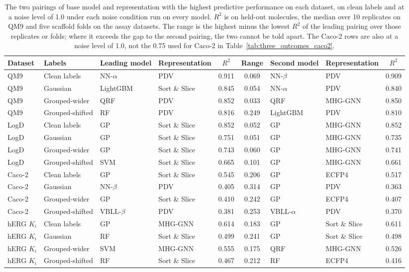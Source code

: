 \begin{table}[!htbp]
\centering
\small
\begin{adjustbox}{max width=\textwidth,max totalheight=0.78\textheight}
\begin{tabular}{llllccllc}
\toprule
Dataset & Labels & Leading model & Representation & $R^2$ & Range & Second model & Representation & $R^2$ \\
\midrule
QM9 & Clean labels & NN-$\alpha$ & PDV & 0.911 & 0.069 & NN-$\beta$ & PDV & 0.909 \\
QM9 & Gaussian & LightGBM & Sort \& Slice & 0.845 & 0.054 & NN-$\alpha$ & PDV & 0.840 \\
QM9 & Grouped-wider & QRF & PDV & 0.852 & 0.033 & QRF & MHG-GNN & 0.850 \\
QM9 & Grouped-shifted & RF & PDV & 0.816 & 0.249 & LightGBM & PDV & 0.810 \\
LogD & Clean labels & GP & Sort \& Slice & 0.852 & 0.052 & GP & MHG-GNN & 0.852 \\
LogD & Gaussian & GP & Sort \& Slice & 0.751 & 0.051 & GP & MHG-GNN & 0.735 \\
LogD & Grouped-wider & GP & Sort \& Slice & 0.743 & 0.060 & GP & MHG-GNN & 0.741 \\
LogD & Grouped-shifted & SVM & Sort \& Slice & 0.665 & 0.101 & GP & MHG-GNN & 0.661 \\
Caco-2 & Clean labels & GP & Sort \& Slice & 0.545 & 0.206 & GP & ECFP4 & 0.517 \\
Caco-2 & Gaussian & NN-$\beta$ & PDV & 0.405 & 0.314 & GP & PDV & 0.363 \\
Caco-2 & Grouped-wider & GP & Sort \& Slice & 0.410 & 0.242 & GP & ECFP4 & 0.407 \\
Caco-2 & Grouped-shifted & VBLL-$\beta$ & PDV & 0.381 & 0.253 & VBLL-$\alpha$ & PDV & 0.370 \\
hERG $K_i$ & Clean labels & GP & MHG-GNN & 0.614 & 0.183 & GP & Sort \& Slice & 0.611 \\
hERG $K_i$ & Gaussian & RF & Sort \& Slice & 0.499 & 0.241 & GP & Sort \& Slice & 0.498 \\
hERG $K_i$ & Grouped-wider & SVM & MHG-GNN & 0.555 & 0.175 & QRF & MHG-GNN & 0.526 \\
hERG $K_i$ & Grouped-shifted & RF & Sort \& Slice & 0.467 & 0.212 & RF & ECFP4 & 0.416 \\
\bottomrule
\end{tabular}
\end{adjustbox}
\caption[Leading pairings of model and representation on each dataset.]{The two pairings of base model and representation with the highest predictive performance on each dataset, on clean labels and at a noise level of 1.0 under each noise condition run on every model. $R^2$ is on held-out molecules, the median over 10 replicates on QM9 and five scaffold folds on the assay datasets. The range is the highest minus the lowest $R^2$ of the leading pairing over those replicates or folds; where it exceeds the gap to the second pairing, the two cannot be told apart. The Caco-2 rows are also at a noise level of 1.0, not the 0.75 used for Caco-2 in Table~\ref{tab:three_outcomes_caco2}.}
\label{tab:leaders}
\end{table}

